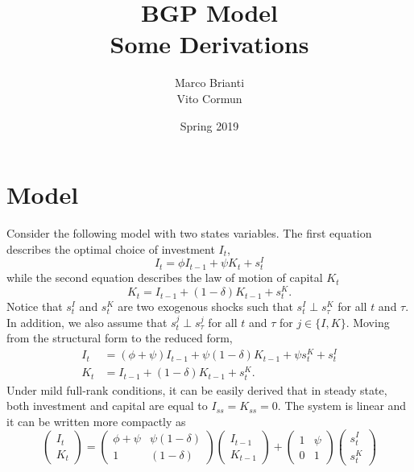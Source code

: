 \documentclass{article}
\title{BGP Model\\Some Derivations}
\author{Marco Brianti\\Vito Cormun}
\date{Spring 2019}
\begin{document}
\maketitle

\section{Model}\label{sec:model}

Consider the following model with two states variables. The first equation describes the optimal choice of investment $I_t$,
\begin{equation}\label{eq:optimal_investment}
I_t = \phi I_{t-1} + \psi K_{t} + s_t^I
\end{equation}
while the second equation describes the law of motion of capital $K_t$
\begin{equation}\label{eq:LOMcapital}
K_t =  I_{t-1} + (1 - \delta) K_{t-1} + s_t^K.
\end{equation}
Notice that $s_t^I$ and $s_t^K$ are two exogenous shocks such that $s_t^I \perp s_{\tau}^K$ for all $t$ and $\tau$. In addition, we also assume that $s_t^j \perp s_{\tau}^j$ for all $t$ and $\tau$ for $j \in \{ I,K\}$. Moving from the structural form to the reduced form,
\begin{equation}\label{eq:reduced_form}
\begin{aligned}
I_t &= ( \phi + \psi) I_{t-1} + \psi (1 - \delta) K_{t-1} + \psi s_t^K + s_t^I \\
K_t &= I_{t-1} + (1 - \delta) K_{t-1} + s_t^K.
\end{aligned}
\end{equation}
Under mild full-rank conditions, it can be easily derived that in steady state, both investment and capital are equal to $I_{ss} = K_{ss} = 0$. The system is linear and it can be written more compactly as
\begin{equation}\label{eq:matrix_system_expanded}
\begin{pmatrix}
I_t \\
K_t
\end{pmatrix} = \begin{pmatrix}
\phi + \psi & \psi (1 - \delta) \\
1 & (1 - \delta)
\end{pmatrix}\begin{pmatrix}
I_{t-1} \\
K_{t-1}
\end{pmatrix} + \begin{pmatrix}
1 & \psi  \\
0 & 1
\end{pmatrix} \begin{pmatrix}
s_t^I \\ 
s_t^K
\end{pmatrix}
\end{equation}
\end{document}
